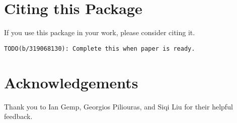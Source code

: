 \documentclass[10pt]{article}
\begin{document}
\section{Citing this Package}

If you use this package in your work, please consider citing it.

\begin{verbatim}
TODO(b/319068130): Complete this when paper is ready.
\end{verbatim}

\section{Acknowledgements}

Thank you to Ian Gemp, Georgios Piliouras, and Siqi Liu for their helpful feedback.



\end{document}
